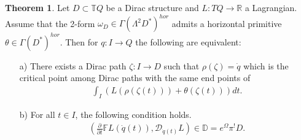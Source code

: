\documentclass[a4paper,12pt]{amsart}
\theoremstyle{definition}
\newtheorem{Theorem}[Definition]{Theorem}
\begin{document}
 
 
 
 \begin{Theorem}
 \label{theorem-ILS}
 Let $D\subset \mathbb TQ$ be a Dirac structure and $L:TQ\to\mathbb R$ a Lagrangian. Assume that the 2-form $\omega_D\in \Gamma(\Lambda^2D^*)^{hor}$ admits a {horizontal} primitive $\theta\in \Gamma(D^*)^{hor}$. Then for $q :I\to Q$ the following are equivalent:
 \begin{enumerate}
     \item[a)] There exists a Dirac path $\zeta: I \to D$ such that $ \rho(\zeta)=\dot q$ which is the critical point among Dirac paths with the same end points of
     \begin{align} \label{eq:ILS-functional} \int_I (L (\rho(\zeta(t))) + \theta (\zeta(t)))  dt .\end{align}
      \item[b)] For all $t\in I$, the following condition holds.
      \begin{align}\label{eq:graphcondition}
          \left(\frac{\partial }{\partial t}\mathbb FL(\dot q(t)), \mathcal D_{\dot q(t)}L\right)\in \mathbb D=e^\Omega\pi^!D.
      \end{align} 
 \end{enumerate}
 
 \end{Theorem}
\end{document}
